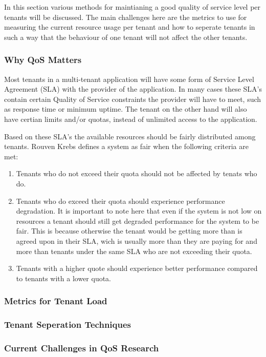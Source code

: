 In this section various methods for maintianing a good quality of service level per tenants will be discussed.
The main challenges here are the metrics to use for measuring the current resource usage per tenant and how to seperate tenants in such a way that the behaviour of one tenant will not affect the other tenants.\cite{krebs2013metrics}

\subsubsection{Why QoS Matters}
Most tenants in a multi-tenant application will have some form of Service Level Agreement (SLA) with the provider of the application.
In many cases these SLA's contain certain Quality of Service constraints the provider will have to meet, such as response time or minimum uptime. 
The tenant on the other hand will also have certian limits and/or quotas, instead of unlimited access to the application.

Based on these SLA's the available resources should be fairly distributed among tenants.
Rouven Krebs\cite{krebs2013metrics} defines a system as fair when the following criteria are met:
\begin{enumerate}
	\item Tenants who do not exceed their quota should not be affected by tenats who do.
	\item Tenants who do exceed their quota should experience performance degradation. 
		It is important to note here that even if the system is not low on resources a tenant should still get degraded performance for the system to be fair.
		This is because otherwise the tenant would be getting more than is agreed upon in their SLA, wich is usually more than they are paying for and more than tenants under the same SLA who are not exceeding their quota.
	\item Tenants with a higher quote should experience better performance compared to tenants with a lower quota.
\end{enumerate}

\subsubsection{Metrics for Tenant Load}

\subsubsection{Tenant Seperation Techniques}

\subsubsection{Current Challenges in QoS Research}
